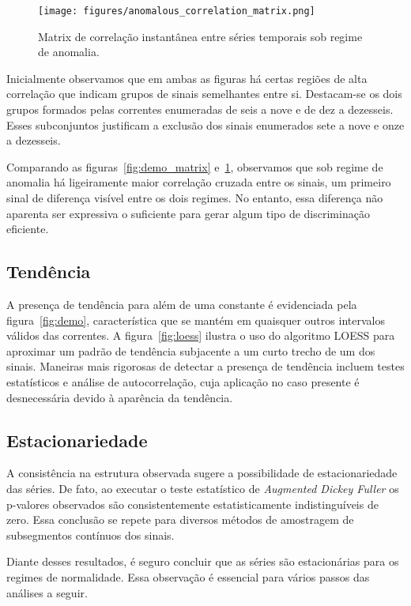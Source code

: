 \begin{figure}[H]
    \centering
    \texttt{[image: figures/anomalous\_correlation\_matrix.png]}
    \caption{Matrix de correlação instantânea entre séries temporais sob
    regime de anomalia.}
    \label{fig:demo_matrix_anomaly}
\end{figure}

Inicialmente observamos que em ambas as figuras há certas regiões de alta
correlação que indicam grupos de sinais semelhantes entre si. Destacam-se os
dois grupos formados pelas correntes enumeradas de seis a nove e de dez a
dezesseis. Esses subconjuntos justificam a exclusão dos sinais enumerados sete
a nove e onze a dezesseis.

Comparando as figuras~\ref{fig:demo_matrix} e~\ref{fig:demo_matrix_anomaly},
observamos que sob regime de anomalia há ligeiramente maior correlação cruzada
entre os sinais, um primeiro sinal de diferença visível entre os dois regimes.
No entanto, essa diferença não aparenta ser expressiva o suficiente para gerar
algum tipo de discriminação eficiente.

\subsection{Tendência}

A presença de tendência para além de uma constante é evidenciada pela
figura~\ref{fig:demo}, característica que se mantém em quaisquer outros
intervalos válidos das correntes. A figura~\ref{fig:loess} ilustra o uso do
algoritmo LOESS para aproximar um padrão de tendência subjacente a um curto
trecho de um dos sinais. Maneiras mais rigorosas de detectar a presença de
tendência incluem testes estatísticos e análise de autocorrelação, cuja
aplicação no caso presente é desnecessária devido à aparência da tendência.

\subsection{Estacionariedade}

A consistência na estrutura observada sugere a possibilidade de
estacionariedade das séries. De fato, ao executar o teste estatístico de
\emph{Augmented Dickey Fuller} os p-valores observados são consistentemente
estatisticamente indistinguíveis de zero. Essa conclusão se repete para
diversos métodos de amostragem de subsegmentos contínuos dos sinais.

Diante desses resultados, é seguro concluir que as séries são estacionárias
para os regimes de normalidade. Essa observação é essencial para vários passos
das análises a seguir.


